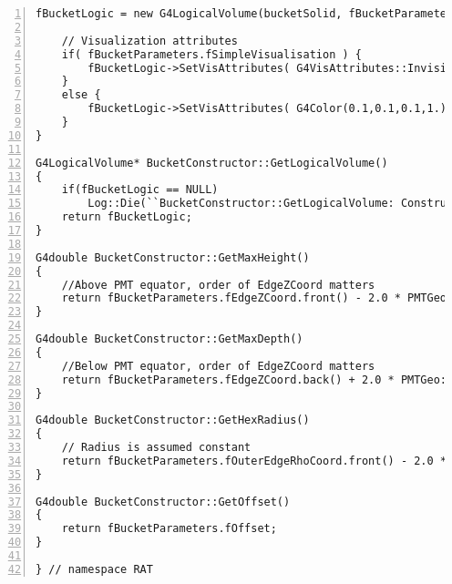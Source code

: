 \documentclass[11pt]{article}
\begin{document}
\begin{Verbatim}[gobble=0,numbers=left]
    fBucketLogic = new G4LogicalVolume(bucketSolid, fBucketParameters.fBulkMaterial, fPrefix + ``_logic'');

    // Visualization attributes
    if( fBucketParameters.fSimpleVisualisation ) {
        fBucketLogic->SetVisAttributes( G4VisAttributes::Invisible );
    }
    else {
        fBucketLogic->SetVisAttributes( G4Color(0.1,0.1,0.1,1.) );
    }
}

G4LogicalVolume* BucketConstructor::GetLogicalVolume()
{
    if(fBucketLogic == NULL)
        Log::Die(``BucketConstructor::GetLogicalVolume: Construct has not been called.'');
    return fBucketLogic;
}

G4double BucketConstructor::GetMaxHeight()
{
    //Above PMT equator, order of EdgeZCoord matters
    return fBucketParameters.fEdgeZCoord.front() - 2.0 * PMTGeo::kFaceGap;
}

G4double BucketConstructor::GetMaxDepth()
{
    //Below PMT equator, order of EdgeZCoord matters
    return fBucketParameters.fEdgeZCoord.back() + 2.0 * PMTGeo::kFaceGap;
}

G4double BucketConstructor::GetHexRadius()
{
    // Radius is assumed constant
    return fBucketParameters.fOuterEdgeRhoCoord.front() - 2.0 * PMTGeo::kFaceGap;
}

G4double BucketConstructor::GetOffset()
{
    return fBucketParameters.fOffset;
}

} // namespace RAT
\end{Verbatim}
\end{document}
